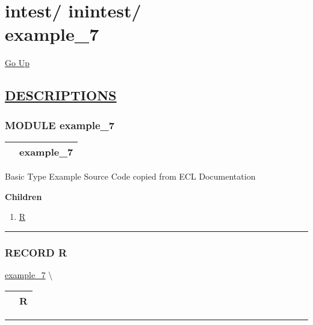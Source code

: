 \chapter*{\color{headfile}
{\large intest\slash\hspace{0pt}}
{\large inintest\slash\hspace{0pt}}
 \\
example_7
}
\hypertarget{ecldoc:toc:intest.inintest.example_7}{}
\hyperlink{ecldoc:toc:root/intest/inintest}{Go Up}


\section*{\underline{\textsf{DESCRIPTIONS}}}
\subsection*{\textsf{\colorbox{headtoc}{\color{white} MODULE}
example\_7}}

\hypertarget{ecldoc:intest.inintest.example_7}{}

{\renewcommand{\arraystretch}{1.5}
\begin{tabularx}{\textwidth}{|>{\raggedright\arraybackslash}l|X|}
\hline
\hspace{0pt}\mytexttt{\color{red} } & \textbf{example\_7} \\
\hline
\end{tabularx}
}

\par
Basic Type Example Source Code copied from ECL Documentation


\textbf{Children}
\begin{enumerate}
\item \hyperlink{ecldoc:intest.inintest.example_7.r}{R}
\end{enumerate}

\rule{\linewidth}{0.5pt}

\subsection*{\textsf{\colorbox{headtoc}{\color{white} RECORD}
R}}

\hypertarget{ecldoc:intest.inintest.example_7.r}{}
\hspace{0pt} \hyperlink{ecldoc:intest.inintest.example_7}{example_7} \textbackslash 

{\renewcommand{\arraystretch}{1.5}
\begin{tabularx}{\textwidth}{|>{\raggedright\arraybackslash}l|X|}
\hline
\hspace{0pt}\mytexttt{\color{red} } & \textbf{R} \\
\hline
\end{tabularx}
}

\par


\rule{\linewidth}{0.5pt}


